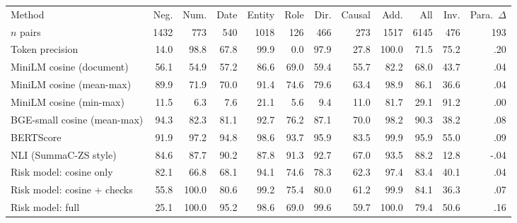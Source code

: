\begin{tabular}{lrrrrrrrrrrr}
\toprule
Method & Neg. & Num. & Date & Entity & Role & Dir. & Causal & Add. & All & Inv. & Para.\ $\Delta$ \\
$n$ pairs & 1432 & 773 & 540 & 1018 & 126 & 466 & 273 & 1517 & 6145 & 476 & 193 \\
\midrule
Token precision & 14.0 & 98.8 & 67.8 & 99.9 & 0.0 & 97.9 & 27.8 & 100.0 & 71.5 & 75.2 & .20 \\
MiniLM cosine (document) & 56.1 & 54.9 & 57.2 & 86.6 & 69.0 & 59.4 & 55.7 & 82.2 & 68.0 & 43.7 & .04 \\
MiniLM cosine (mean-max) & 89.9 & 71.9 & 70.0 & 91.4 & 74.6 & 79.6 & 63.4 & 98.9 & 86.1 & 36.6 & .04 \\
MiniLM cosine (min-max) & 11.5 & 6.3 & 7.6 & 21.1 & 5.6 & 9.4 & 11.0 & 81.7 & 29.1 & 91.2 & .00 \\
BGE-small cosine (mean-max) & 94.3 & 82.3 & 81.1 & 92.7 & 76.2 & 87.1 & 70.0 & 98.2 & 90.3 & 38.2 & .08 \\
\midrule
BERTScore & 91.9 & 97.2 & 94.8 & 98.6 & 93.7 & 95.9 & 83.5 & 99.9 & 95.9 & 55.0 & .09 \\
NLI (SummaC-ZS style) & 84.6 & 87.7 & 90.2 & 87.8 & 91.3 & 92.7 & 67.0 & 93.5 & 88.2 & 12.8 & -.04 \\
\midrule
Risk model: cosine only & 82.1 & 66.8 & 68.1 & 94.1 & 74.6 & 78.3 & 62.3 & 97.4 & 83.4 & 40.1 & .04 \\
Risk model: cosine + checks & 55.8 & 100.0 & 80.6 & 99.2 & 75.4 & 80.0 & 61.2 & 99.9 & 84.1 & 36.3 & .07 \\
Risk model: full & 25.1 & 100.0 & 95.2 & 98.6 & 69.0 & 99.6 & 59.7 & 100.0 & 79.4 & 50.6 & .16 \\
\bottomrule
\end{tabular}
